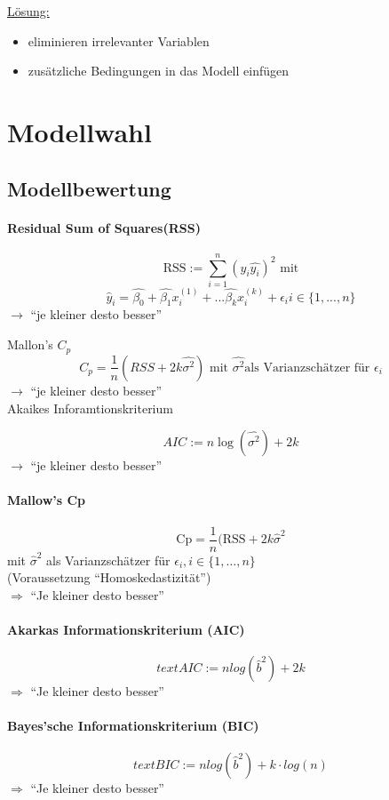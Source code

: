 \documentclass[10pt]{report}
\theoremstyle{definition}
\begin{document}
\underline{Lösung:}
\begin{itemize}
 \item eliminieren irrelevanter Variablen
 \item zusätzliche Bedingungen in das Modell einfügen
\end{itemize}

\section{Modellwahl}
\subsection{Modellbewertung}
\paragraph{Residual Sum of Squares(RSS)}
\[ \text{RSS}:= \sum\limits_{i=1}^{n} (y_i \hat{y_i})^2 \text{ mit} \]
\[ \hat{y}_i =  \hat{\beta_{0}} + \hat{\beta_{1}} x_{i}^{(1)} + ... \hat{\beta_{k}} x_{i}^{(k)} + \epsilon_{i} i \in \{ 1,...,n \} \]
$\rightarrow$ ``je kleiner desto besser''

Mallon's $C_p$ 
\[C_p = \frac{1}{n}(RSS + 2k \hat{\sigma^2}) \text{ mit } \hat{\sigma^2} \text{als Varianzschätzer für }\epsilon_i\]
$\rightarrow$ ``je kleiner desto besser''\\

Akaikes Inforamtionskriterium

\[
	AIC := n \log (\hat{\sigma^2}) + 2k
\]
$\rightarrow$ ``je kleiner desto besser''


\paragraph{Mallow's Cp}
\[ \text{Cp}= \frac{1}{n}(\text{RSS} + 2k \hat{\sigma}^{2} \]
mit $\hat{\sigma}^{2}$ als Varianzschätzer für $\epsilon_i , i \in \{1,\dots,n\}$ \\
(Voraussetzung ``Homoskedastizität'')\\
$\Rightarrow$ ``Je kleiner desto besser''
\paragraph{Akarkas Informationskriterium (AIC) }
\[ text{AIC} := n log (\hat{b}^2) + 2k \]
$\Rightarrow$ ``Je kleiner desto besser''

\paragraph{Bayes'sche Informationskriterium (BIC)}
\[ text{BIC} := n log (\hat{b}^2) + k \cdot log(n) \]
$\Rightarrow$ ``Je kleiner desto besser''
\end{document}
